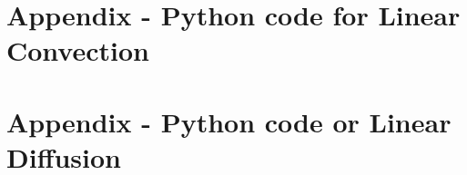 \documentclass[conf]{new-aiaa}
\begin{document}
\pagebreak
 \begin{appendices}
      \section{Appendix - Python code for Linear Convection}\label{appendixA}


      

      \pagebreak

	\section{Appendix - Python code or Linear Diffusion}\label{appendixB}

	

	\pagebreak
\end{appendices}
\end{document}
